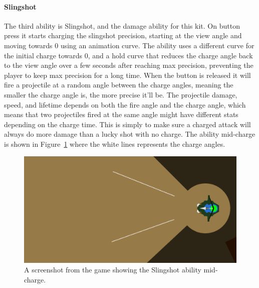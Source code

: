 \paragraph{Slingshot}
The third ability is Slingshot, and the damage ability for this kit. On button press it starts charging the slingshot precision, starting at the view angle and moving towards 0 using an animation curve. The ability uses a different curve for the initial charge towards 0, and a hold curve that reduces the charge angle back to the view angle over a few seconds after reaching max precision, preventing the player to keep max precision for a long time. When the button is released it will fire a projectile at a random angle between the charge angles, meaning the smaller the charge angle is, the more precise it'll be. The projectile damage, speed, and lifetime depends on both the fire angle and the charge angle, which means that two projectiles fired at the same angle might have different stats depending on the charge time. This is simply to make sure a charged attack will always do more damage than a lucky shot with no charge. The ability mid-charge is shown in Figure~\ref{fig:slingshotCharge} where the white lines represents the charge angles.

\begin{figure}[htbp]  %
  \centering
  \includegraphics[width=\textwidth]{images/SlingshotCharge}
  \caption[Slingshot charge]{A screenshot from the game showing the Slingshot ability mid-charge.}
  \label{fig:slingshotCharge}
\end{figure}

